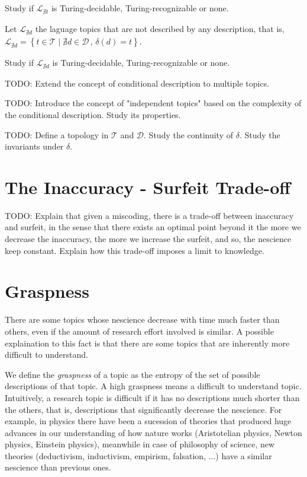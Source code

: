 \begin{proposition}
Study if $\mathcal{L}_{\nexists t}$ is Turing-decidable, Turing-recognizable or none.
\end{proposition}

Let $\mathcal{L}_{\nexists d}$ the laguage topics that are not described by any description, that is, $\mathcal{L}_{\nexists d}=\left\{ t\in\mathcal{T}\mid\nexists d\in\mathcal{D}\,,\,\delta\left(d\right)=t\right\}$.

\begin{proposition}
Study if $\mathcal{L}_{\nexists d}$ is Turing-decidable, Turing-recognizable or none.
\end{proposition}

{\color{red} TODO: Extend the concept of conditional description to multiple topics.}

{\color{red} TODO: Introduce the concept of "independent topics" based on the complexity of the conditional description. Study its properties.}

{\color{red} TODO: Define a topology in $\mathcal{T}$ and $\mathcal{D}$. Study the continuity of $\delta$. Study the invariants under $\delta$.}


%
%

\section{The Inaccuracy - Surfeit Trade-off}

{\color{red} TODO: Explain that given a miscoding, there is a trade-off between inaccuracy and surfeit, in the sense that there exists an optimal point beyond it the more we decrease the inaccuracy, the more we increase the surfeit, and so, the nescience keep constant. Explain how this trade-off imposes a limit to knowledge.}


%
%
\section{Graspness}

There are some topics whose nescience decrease with time much faster than others, even if the amount of research effort involved is similar. A possible explaination to this fact is that there are some topics that are inherently more difficult to understand.

We define the \emph{graspness} of a topic as the entropy of the set of possible descriptions of that topic. A high graspness means a difficult to understand topic. Intuitively, a research topic is difficult if it has no descriptions much shorter than the others, that is, descriptions that significantly decrease the nescience. For example, in physics there have been a sucession of theories that produced huge advances in our understanding of how nature works (Aristotelian physics, Newton physics, Einstein physics), meanwhile in case of philosophy of science, new theories (deductivism, inductivism, empirism, falsation, ...) have a similar nescience than previous ones.

